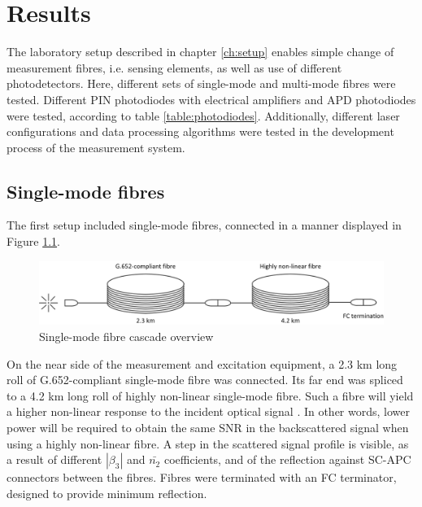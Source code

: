 \documentclass{standalone}
\begin{document}
\chapter{Results} \label{ch:results}
\setcounter{page}\thestranica


The laboratory setup described in chapter \ref{ch:setup} enables simple change of measurement fibres, i.e. sensing elements, as well as use of different photodetectors. Here, different sets of single-mode and multi-mode fibres were tested. Different PIN photodiodes with electrical amplifiers and APD photodiodes were tested, according to table \ref{table:photodiodes}. Additionally, different laser configurations and data processing algorithms were tested in the development process of the measurement system.

\section{Single-mode fibres}

The first setup included single-mode fibres, connected in a manner displayed in Figure \ref{fig:smf_cascade}.
\begin{figure}[h]
	\centering
	\includegraphics[width=\textwidth]{smf_cascade.png}
	\caption{Single-mode fibre cascade overview}
	\label{fig:smf_cascade}
\end{figure}
On the near side of the measurement and excitation equipment, a 2.3 km long roll of G.652-compliant single-mode fibre was connected. Its far end was spliced to a 4.2 km long roll of highly non-linear single-mode fibre. Such a fibre will yield a higher non-linear response to the incident optical signal \cite{Hiroishi2003}. In other words, lower power will be required to obtain the same SNR in the backscattered signal when using a highly non-linear fibre. A step in the scattered signal profile is visible, as a result of different $\left|\beta_3\right|$ and $\bar{n_2}$ coefficients, and of the reflection against SC-APC connectors between the fibres. Fibres were terminated with an FC terminator, designed to provide minimum reflection. \\
\end{document}
